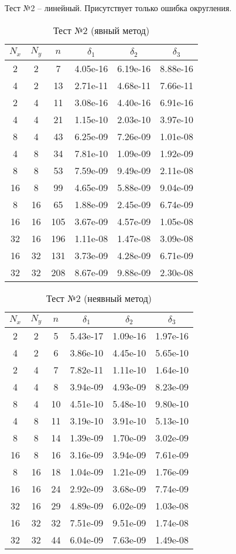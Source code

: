 \newpage
Тест №2 -- линейный. Присутствует только ошибка округления.
\begin{table}[H]
	\centering
	\begin{tabular}{*6c}
		\toprule
		$N_x$ & $N_y$ & $n$ & $\delta_1$ & $\delta_2$ & $\delta_3$ \\
		\midrule
		2 & 2 & 7 & 4.05e-16 & 6.19e-16 & 8.88e-16 \\
		4 & 2 & 13 & 2.71e-11 & 4.68e-11 & 7.66e-11 \\
		2 & 4 & 11 & 3.08e-16 & 4.40e-16 & 6.91e-16 \\
		4 & 4 & 21 & 1.15e-10 & 2.03e-10 & 3.97e-10 \\
		8 & 4 & 43 & 6.25e-09 & 7.26e-09 & 1.01e-08 \\
		4 & 8 & 34 & 7.81e-10 & 1.09e-09 & 1.92e-09 \\
		8 & 8 & 53 & 7.59e-09 & 9.49e-09 & 2.11e-08 \\
		16 & 8 & 99 & 4.65e-09 & 5.88e-09 & 9.04e-09 \\
		8 & 16 & 65 & 1.88e-09 & 2.45e-09 & 6.74e-09 \\
		16 & 16 & 105 & 3.67e-09 & 4.57e-09 & 1.05e-08 \\
		32 & 16 & 196 & 1.11e-08 & 1.47e-08 & 3.09e-08 \\
		16 & 32 & 131 & 3.73e-09 & 4.28e-09 & 6.71e-09 \\
		32 & 32 & 208 & 8.67e-09 & 9.88e-09 & 2.30e-08 \\
		\bottomrule
	\end{tabular}
	\caption{Тест №2 (явный метод)}
\end{table}
\begin{table}[H]
	\centering
	\begin{tabular}{*6c}
		\toprule
		$N_x$ & $N_y$ & $n$ & $\delta_1$ & $\delta_2$ & $\delta_3$ \\
		\midrule
		2 & 2 & 5 & 5.43e-17 & 1.09e-16 & 1.97e-16 \\
		4 & 2 & 6 & 3.86e-10 & 4.45e-10 & 5.65e-10 \\
		2 & 4 & 7 & 7.82e-11 & 1.11e-10 & 1.64e-10 \\
		4 & 4 & 8 & 3.94e-09 & 4.93e-09 & 8.23e-09 \\
		8 & 4 & 10 & 4.51e-10 & 5.48e-10 & 9.80e-10 \\
		4 & 8 & 11 & 3.19e-10 & 3.91e-10 & 5.13e-10 \\
		8 & 8 & 14 & 1.39e-09 & 1.70e-09 & 3.02e-09 \\
		16 & 8 & 16 & 3.16e-09 & 3.94e-09 & 7.61e-09 \\
		8 & 16 & 18 & 1.04e-09 & 1.21e-09 & 1.76e-09 \\
		16 & 16 & 24 & 2.92e-09 & 3.68e-09 & 7.74e-09 \\
		32 & 16 & 29 & 4.89e-09 & 6.02e-09 & 1.03e-08 \\
		16 & 32 & 32 & 7.51e-09 & 9.51e-09 & 1.74e-08 \\
		32 & 32 & 44 & 6.04e-09 & 7.63e-09 & 1.49e-08 \\
		\bottomrule
	\end{tabular}
	\caption{Тест №2 (неявный метод)}
\end{table}

